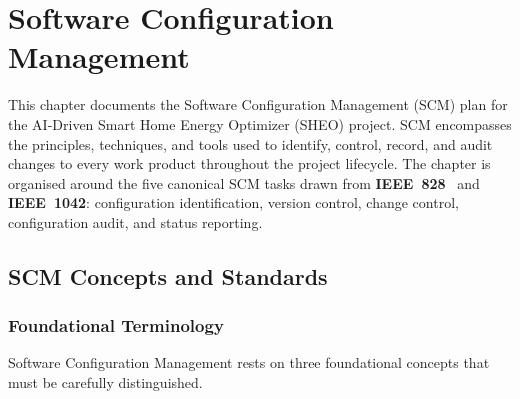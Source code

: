 \chapter{Software Configuration Management}

This chapter documents the Software Configuration Management (SCM) plan for the
AI-Driven Smart Home Energy Optimizer (SHEO) project. SCM encompasses the
principles, techniques, and tools used to identify, control, record, and audit
changes to every work product throughout the project lifecycle. The chapter is
organised around the five canonical SCM tasks drawn from \textbf{IEEE~828}~\cite{ieee828} and
\textbf{IEEE~1042}: configuration identification, version control, change control,
configuration audit, and status reporting.

\section{SCM Concepts and Standards}
\label{sec:scm-concepts}

\subsection{Foundational Terminology}

Software Configuration Management rests on three foundational concepts that must
be carefully distinguished.

